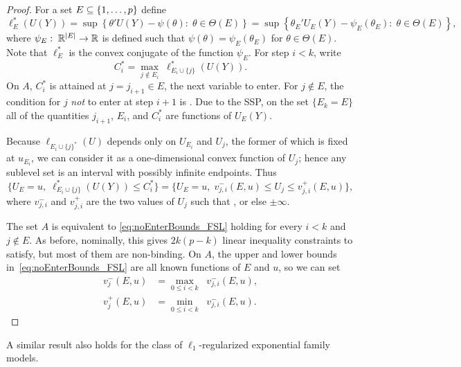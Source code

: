 \documentclass{article}
\begin{document}
\begin{proof}
  For a set $E\subseteq \{1,\ldots,p\}$ define
  \[
  \ell_E^*(U(Y)) 
  = \sup\left\{\theta'U(Y) - \psi(\theta) :\; \theta\in \Theta(E) \right\}
  = \sup\left\{\theta_E'U_E(Y) - \psi_E(\theta_E):\; \theta\in\Theta(E) \right\},
  \]
  where $\psi_E:\; \mathbb{R}^{|E|} \rightarrow \mathbb{R}$ is defined such that $\psi(\theta)=\psi_E(\theta_E)$ for $\theta\in \Theta(E)$. Note that $\ell_E^*$ is the convex conjugate of the function $\psi_E$. For step $i<k$, write
  \[
  C_i^* = \max_{j \notin E_i} \;\ell_{E_i\cup \{j\}}^*(U(Y)).
  \]
  On $A$, $C_i^*$ is attained at $j=j_{i+1}\in E$, the next variable to enter. For $j\notin E$, the condition for $j$ {\em not} to enter at step $i+1$ is . Due to the SSP, on the set $\{E_k=E\}$ all of the quantities $j_{i+1}$, $E_i$, and $C_i^*$ are functions of $U_E(Y)$.

  Because $\ell_{E_i\cup \{j\}^*}(U)$ depends only on $U_{E_i}$ and $U_j$, the former of which is fixed at $u_{E_i}$, we can consider it as a one-dimensional convex function of $U_j$; hence any sublevel set is an interval with possibly infinite endpoints. Thus
  \begin{equation}\label{eq:noEnterBounds_FSL}
  \{U_E=u, \; \ell_{E_i\cup \{j\}}^*(U(Y)) \leq C_i^*\} 
  = \{ U_E=u, \; v_{j,i}^-(E,u) \leq U_j \leq v_{j,i}^+(E,u)\},
  \end{equation}
  where $v_{j,i}^{-}$ and $v_{j,i}^+$ are the two values of $U_j$ such that , or else $\pm\infty$.

  The set $A$ is equivalent to 
  \eqref{eq:noEnterBounds_FSL} holding
  for every $i < k$ and $j \notin E$. As before, nominally, this gives $2k(p-k)$ 
  linear inequality constraints to satisfy, but most of them are
  non-binding. On $A$, the upper and lower bounds
  in~\eqref{eq:noEnterBounds_FSL}
  are all known functions of $E$ and $u$, so we can set
  \begin{align}\label{eq:vMinus_FSL}
    v_j^-(E,u) &= \max_{0 \leq i < k} \;\;v_{j,i}^-(E,u),\\
    \label{eq:vPlus_FSL}
    v_j^+(E,u) &= \min_{0 \leq i < k} \;\;v_{j,i}^-(E,u).
  \end{align}
\end{proof}

A similar result also holds for the class of $\ell_1$-regularized exponential family models.
\end{document}
